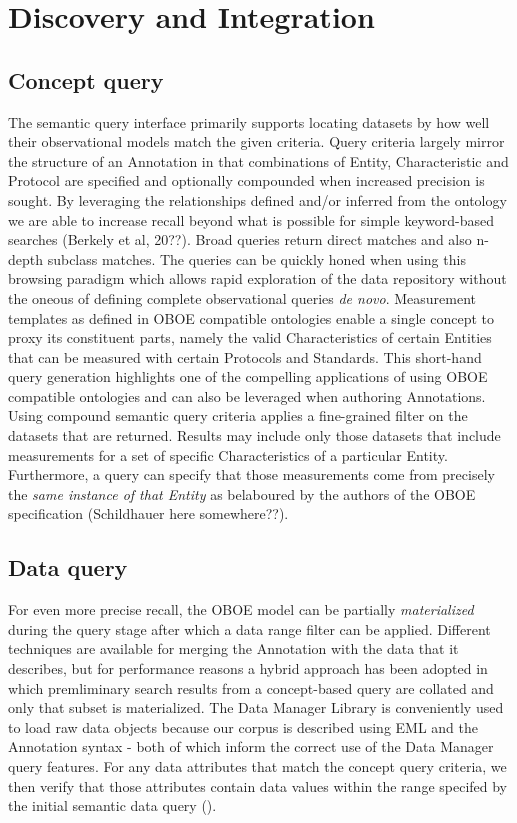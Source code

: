 
\section{Discovery and Integration}

\subsection{Concept query}
The semantic query interface primarily supports locating datasets by how well their observational models match the given criteria. Query criteria largely mirror the structure of an Annotation in that combinations of Entity, Characteristic and Protocol are specified and optionally compounded when increased precision is sought. 
By leveraging the relationships defined and/or inferred from the ontology we are able to increase recall beyond what is possible for simple keyword-based searches (Berkely et al, 20??). Broad queries return direct matches and also n-depth subclass matches. The queries can be quickly honed when using this browsing paradigm which allows rapid exploration of the data repository without the oneous of defining complete observational queries \emph{de novo}. Measurement templates as defined in OBOE compatible ontologies enable a single concept to proxy its constituent parts, namely the valid Characteristics of certain Entities that can be measured with certain Protocols and Standards. This short-hand query generation highlights one of the compelling applications of using OBOE compatible ontologies and can also be leveraged when authoring Annotations.
Using compound semantic query criteria applies a fine-grained filter on the datasets that are returned. Results may include only those datasets that include measurements for a set of specific Characteristics of a particular Entity. Furthermore, a query can specify that those measurements come from precisely the \emph{same instance of that Entity} as belaboured by the authors of the OBOE specification (Schildhauer here somewhere??).

\subsection{Data query}
For even more precise recall, the OBOE model can be partially \emph{materialized} during the query stage after which a data range filter can be applied. Different techniques are available for merging the Annotation with the data that it describes, but for performance reasons a hybrid approach has been adopted in which premliminary search results from a concept-based query are collated and only that subset is materialized. The Data Manager Library is conveniently used to load raw data objects because our corpus is described using EML and the Annotation syntax - both of which inform the correct use of the Data Manager query features. For any data attributes that match the concept query criteria, we then verify that those attributes contain data values within the range specifed by the initial semantic data query ().

